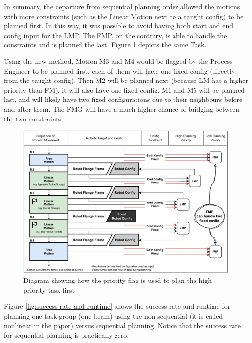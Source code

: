 In summary, the departure from sequential planning order allowed the motions with more constraints (such as the Linear Motion next to a taught config) to be planned first. In this way, it was possible to avoid having both start and end config input for the LMP. The FMP, on the contrary, is able to handle the constraints and is planned the last. Figure \ref{fig:priority-flag-no-over-constraint} depicts the same  Task.

Using the new method, Motion M3 and M4 would be flagged by the Process Engineer to be planned first, each of them will have one fixed config (directly from the taught config). Then M2 will be planned next (because LM has a higher priority than FM), it will also have one fixed config. M1 and M5 will be planned last, and will likely have two fixed configurations due to their neighbours before and after them. The FMG will have a much higher chance of bridging between the two constraints.

\begin{figure}[!h]
    \centering
    \includegraphics[width=0.99\textwidth]{images/6a/planningorder-2.pdf}
    \caption{Diagram showing how the priority flag is used to plan the high priority task first}
    \label{fig:priority-flag-no-over-constraint}
\end{figure}


Figure \ref{fig:success-rate-and-runtime} \parencite{huangNewAnalogProtocol2021} shows the success rate and runtime for planning one task group (one beam) using the non-sequential (it is called nonlinear in the paper) versus sequential planning. Notice that the success rate for sequential planning is practically zero.


